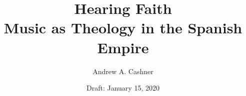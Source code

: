 \documentclass{tex/vcbook}
\title{Hearing Faith\\
Music as Theology in the Spanish Empire}
\author{Andrew A. Cashner}
\date{Draft: January 15, 2020}
\begin{document}
\maketitle

\frontmatter


\tableofcontents* \clearpage
\listoffigures
\listofdiagrams
\listoftables
\listofpoemexamples
\listofmusicexamples

\mainmatter







\backmatter


\end{document}
